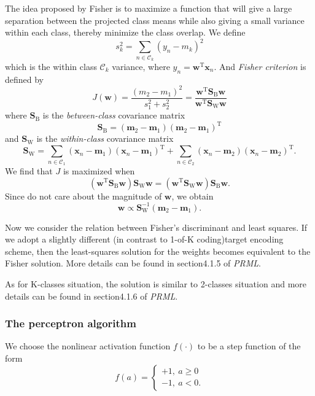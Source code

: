 \documentclass[a4paper]{book}
\newcommand{\mrm}{\mathrm}
\newcommand{\mbf}{\mathbf}
\newcommand{\mcal}{\mathcal}
\newcommand{\mB}{\mrm B}
\newcommand{\mW}{\mrm W}
\newcommand{\ww}{\mbf w}
\newcommand{\mm}{\mbf m}
\newcommand{\xx}{\mbf x}
\newcommand{\rev}{^{-1}}
\newcommand{\trans}{^{\mrm T}}
\begin{document}
The idea proposed by Fisher is to maximize a function that will give a large separation between the projected class means while also giving a small variance within each class, thereby minimize the class overlap. We define
\begin{equation}\label{}
  s_k^2=\sum_{n\in\mcal C_k}(y_n-m_k)^2
\end{equation}
which is the within class $\mcal C_k$ variance, where $y_n=\ww\trans\xx_n$. And \textit{Fisher criterion} is defined by
\begin{equation}\label{}
  J(\ww) = \frac{(m_2-m_1)^2}{s_1^2+s_2^2} = \frac{\ww\trans\mbf S_\mB\ww}{\ww\trans\mbf S_\mW\ww}
\end{equation}
where $\mbf S_\mB$ is the \textit{between-class} covariance matrix
\begin{equation}\label{}
  \mbf S_\mB = (\mm_2-\mm_1)(\mm_2-\mm_1)\trans
\end{equation}
and $\mbf S_\mW$ is the \textit{within-class} covariance matrix
\begin{equation}\label{}
  \mbf S_\mW = \sum_{n\in\mcal C_1}(\xx_n-\mm_1)(\xx_n-\mm_1)\trans+\sum_{n\in\mcal C_2}(\xx_n-\mm_2)(\xx_n-\mm_2)\trans.
\end{equation}
We find that $J$ is maximized when
\begin{equation}\label{}
  (\ww\trans\mbf S_\mB\ww)\mbf S_\mW\ww=(\ww\trans\mbf S_\mW\ww)\mbf S_\mB\ww.
\end{equation}
Since do not care about the magnitude of $\ww$, we obtain
\begin{equation}\label{}
  \ww\propto\mbf S_\mW\rev(\mm_2-\mm_1).
\end{equation}

Now we consider the relation between Fisher's discriminant and least squares. If we adopt a slightly different (in contrast to 1-of-K coding)target encoding scheme, then the least-squares solution for the weights becomes equivalent to the Fisher solution. More details can be found in section4.1.5 of \textit{PRML}.

As for K-classes situation, the solution is similar to 2-classes situation and more details can be found in section4.1.6 of \textit{PRML}.


\subsubsection*{The perceptron algorithm}
We choose the nonlinear activation function $f(\cdot)$ to be a step function of the form
\begin{equation}\label{}
  f(a) = \left\{
  \begin{array}{c}
    +1,\ a\geq 0 \\
    -1,\  a<0.
  \end{array}
  \right .
\end{equation}
\end{document}
